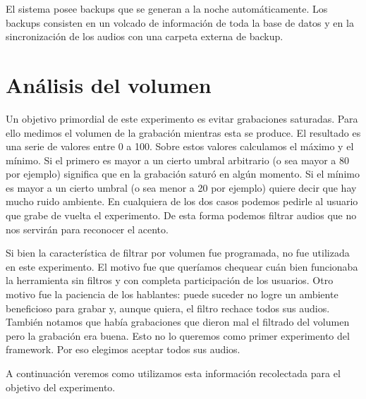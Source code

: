 El sistema posee backups que se generan a la noche automáticamente. Los backups consisten en un volcado de información de toda la base de datos y en la sincronización de los audios con una carpeta externa de backup.

\section{Análisis del volumen}

Un objetivo primordial de este experimento es evitar grabaciones saturadas. Para ello medimos el volumen de la grabación mientras esta se produce. El resultado es una serie de valores entre 0 a 100. Sobre estos valores calculamos el máximo y el mínimo. Si el primero es mayor a un cierto umbral arbitrario (o sea mayor a 80 por ejemplo) significa que en la grabación saturó en algún momento. Si el mínimo es mayor a un cierto umbral (o sea menor a 20 por ejemplo) quiere decir que hay mucho ruido ambiente. En cualquiera de los dos casos podemos pedirle al usuario que grabe de vuelta el experimento. De esta forma podemos filtrar audios que no nos servirán para reconocer el acento.

Si bien la característica de filtrar por volumen fue programada, no fue utilizada en este experimento. El motivo fue que queríamos chequear cuán bien funcionaba la herramienta sin filtros y con completa participación de los usuarios. Otro motivo fue la paciencia de los hablantes: puede suceder no logre un ambiente beneficioso para grabar y, aunque quiera, el filtro rechace todos sus audios. También notamos que había grabaciones que dieron mal el filtrado del volumen pero la grabación era buena. Esto no lo queremos como primer experimento del framework. Por eso elegimos aceptar todos sus audios.

A continuación veremos como utilizamos esta información recolectada para el objetivo del experimento.